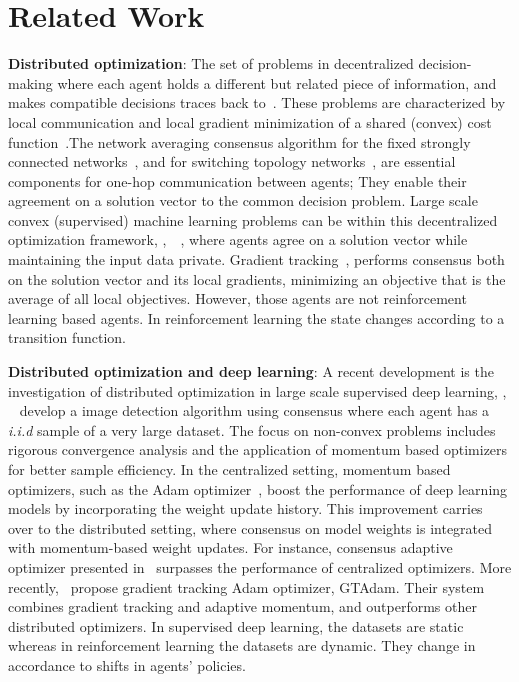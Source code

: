 \section{Related Work}
\textbf{Distributed optimization}: The set of problems in decentralized decision-making where each agent holds a different  but related piece of information, and makes compatible decisions traces back to~\citet{tsitsiklis_1985}. These problems are characterized by local communication and local gradient minimization of a shared (convex) cost function~\citep{nedic_2020}.The network averaging consensus algorithm for the fixed strongly connected networks~\citep{xiao_2003}, and for switching topology networks~\citep{xiao_2007}, are essential components for one-hop communication between agents; They enable their agreement on a solution vector to the common decision problem. Large scale convex (supervised) machine learning problems can be within this decentralized  optimization framework, \eg,~\citep{forero_2010}~\citep{chang_2020}, where agents agree on a solution vector while maintaining the input data private. Gradient tracking~\citet{qu_2018}, performs consensus both on the solution vector and its local gradients, minimizing an objective that is the average of all local objectives. However, those agents are not reinforcement learning based agents. In reinforcement learning the state changes according to a transition function.

\textbf{Distributed optimization and deep learning}: A recent development is the investigation of distributed optimization in large scale supervised deep learning, \eg, ~\citep{jiang_2017} develop a image detection algorithm using consensus where each agent has a \textit{i.i.d} sample of a very large dataset. The focus on non-convex problems includes rigorous convergence analysis and the application of momentum based optimizers for better sample efficiency. In the centralized setting, momentum based optimizers, such as the Adam optimizer~\citet{kingma_2014}, boost the performance of deep learning models by incorporating the weight update history. This improvement carries over to the distributed setting, where consensus on model weights is integrated with momentum-based weight updates. For instance, consensus adaptive optimizer presented in~\citet{nazari_2022} surpasses the performance of  centralized optimizers. More recently,~\citet{carnevale_2023} propose gradient tracking Adam optimizer, GTAdam. Their system combines gradient tracking and adaptive momentum, and outperforms  other distributed optimizers. In supervised deep learning, the datasets are static whereas in reinforcement learning the datasets are dynamic. They change in accordance to shifts in agents' policies.

